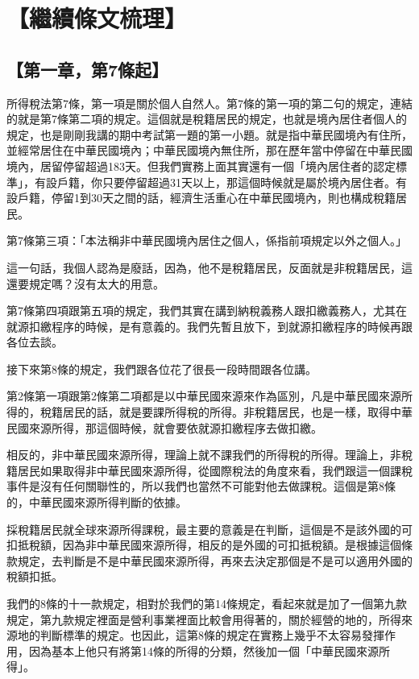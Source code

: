 \documentclass[]{ctexbook}
\begin{document}
\hypertarget{ux7e7cux7e8cux689dux6587ux68b3ux7406}{%
\section{【繼續條文梳理】}\label{ux7e7cux7e8cux689dux6587ux68b3ux7406}}

\hypertarget{ux7b2cux4e00ux7ae0ux7b2c7ux689dux8d77}{%
\subsection{【第一章，第7條起】}\label{ux7b2cux4e00ux7ae0ux7b2c7ux689dux8d77}}

所得稅法第7條，第一項是關於個人自然人。第7條的第一項的第二句的規定，連結的就是第7條第二項的規定。這個就是稅籍居民的規定，也就是境內居住者個人的規定，也是剛剛我講的期中考試第一題的第一小題。就是指中華民國境內有住所，並經常居住在中華民國境內；中華民國境內無住所，那在歷年當中停留在中華民國境內，居留停留超過183天。但我們實務上面其實還有一個「境內居住者的認定標準」，有設戶籍，你只要停留超過31天以上，那這個時候就是屬於境內居住者。有設戶籍，停留1到30天之間的話，經濟生活重心在中華民國境內，則也構成稅籍居民。

第7條第三項：「本法稱非中華民國境內居住之個人，係指前項規定以外之個人。」

這一句話，我個人認為是廢話，因為，他不是稅籍居民，反面就是非稅籍居民，這還要規定嗎？沒有太大的用意。

第7條第四項跟第五項的規定，我們其實在講到納稅義務人跟扣繳義務人，尤其在就源扣繳程序的時候，是有意義的。我們先暫且放下，到就源扣繳程序的時候再跟各位去談。

接下來第8條的規定，我們跟各位花了很長一段時間跟各位講。

第2條第一項跟第2條第二項都是以中華民國來源來作為區別，凡是中華民國來源所得的，稅籍居民的話，就是要課所得稅的所得。非稅籍居民，也是一樣，取得中華民國來源所得，那這個時候，就會要依就源扣繳程序去做扣繳。

相反的，非中華民國來源所得，理論上就不課我們的所得稅的所得。理論上，非稅籍居民如果取得非中華民國來源所得，從國際稅法的角度來看，我們跟這一個課稅事件是沒有任何關聯性的，所以我們也當然不可能對他去做課稅。這個是第8條的，中華民國來源所得判斷的依據。

採稅籍居民就全球來源所得課稅，最主要的意義是在判斷，這個是不是該外國的可扣抵稅額，因為非中華民國來源所得，相反的是外國的可扣抵稅額。是根據這個條款規定，去判斷是不是中華民國來源所得，再來去決定那個是不是可以適用外國的稅額扣抵。

我們的8條的十一款規定，相對於我們的第14條規定，看起來就是加了一個第九款規定，第九款規定裡面是營利事業裡面比較會用得著的，關於經營的地的，所得來源地的判斷標準的規定。也因此，這第8條的規定在實務上幾乎不太容易發揮作用，因為基本上他只有將第14條的所得的分類，然後加一個「中華民國來源所得」。
\end{document}
